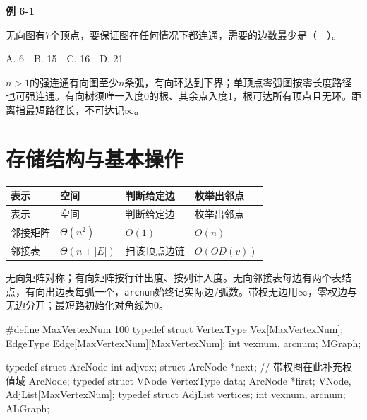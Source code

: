 \par\medskip{}\noindent\hypertarget{DS06-E01}{}\label{DS06-E01}\textbf{例 6-1}\par\nobreak\smallskip

无向图有7个顶点，要保证图在任何情况下都连通，需要的边数最少是（　）。

A. 6　B. 15　C. 16　D. 21

\(n>1\)的强连通有向图至少\(n\)条弧，有向环达到下界；单顶点零弧图按零长度路径也可强连通。有向树须唯一入度0的根、其余点入度1，根可达所有顶点且无环。距离指最短路径长，不可达记\(\infty\)。

\section{存储结构与基本操作}\label{DS06-storage}

\par\smallskip
{\fontsize{9.3}{12}\selectfont\setlength{\tabcolsep}{2.5pt}\setlength{\LTleft}{0pt}\setlength{\LTright}{0pt}
\begin{longtable}{@{}>{\raggedright\arraybackslash}p{}>{\raggedright\arraybackslash}p{}>{\raggedright\arraybackslash}p{}>{\raggedright\arraybackslash}p{}@{}}
\toprule
表示 & 空间 & 判断给定边 & 枚举出邻点 \\

\midrule\endfirsthead\toprule
表示 & 空间 & 判断给定边 & 枚举出邻点 \\

\midrule\endhead\bottomrule\endfoot
邻接矩阵 & \(\Theta(n^2)\) & \(O(1)\) & \(O(n)\) \\

邻接表 & \(\Theta(n+|E|)\) & 扫该顶点边链 & \(O(OD(v))\) \\

\end{longtable}}
\par\smallskip

无向矩阵对称；有向矩阵按行计出度、按列计入度。无向邻接表每边有两个表结点，有向出边表每弧一个，\texttt{arcnum}始终记实际边/弧数。带权无边用\(\infty\)，零权边与无边分开；最短路初始化对角线为0。

\par\smallskip\noindent\begin{minipage}{\linewidth}
\begin{codeblock}[language={C++}]
#define MaxVertexNum 100
typedef struct {
    VertexType Vex[MaxVertexNum];
    EdgeType Edge[MaxVertexNum][MaxVertexNum];
    int vexnum, arcnum;
} MGraph;

typedef struct ArcNode {
    int adjvex;
    struct ArcNode *next;
    // 带权图在此补充权值域
} ArcNode;
typedef struct VNode {
    VertexType data;
    ArcNode *first;
} VNode, AdjList[MaxVertexNum];
typedef struct {
    AdjList vertices;
    int vexnum, arcnum;
} ALGraph;
\end{codeblock}
\end{minipage}\par\smallskip

